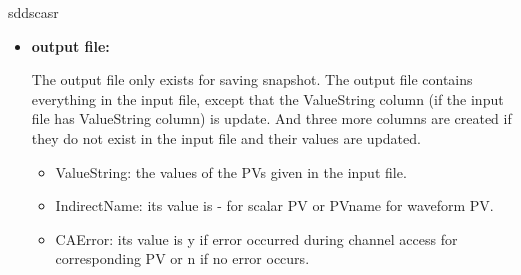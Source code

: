 \begin{sddsprog}{sddscasr}
\begin{itemize}
warning.
  \item \textbf{output file:} \par
The output file only exists for saving snapshot. The output file contains everything in the input
file, except that the ValueString column (if the input file has ValueString column) is update. And
three more columns are created if they do not exist in the input file and their values are updated.
  \begin{itemize}
    \item {ValueString}: the values of the PVs given in the input file.
    \item {IndirectName}: its value  is - for scalar PV or PVname for waveform PV.
    \item {CAError}: its value is y if error occurred during channel access for
corresponding PV or n if no error occurs.
  \end{itemize}
\end{itemize}


\end{sddsprog}
